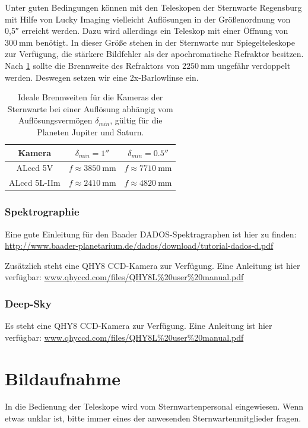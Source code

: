 \documentclass[10pt,a4paper,titlepage]{article}
\begin{document}
Unter guten Bedingungen können mit den Teleskopen der Sternwarte Regensburg mit Hilfe von Lucky Imaging vielleicht Auflösungen in der Größenordnung von \ang{;;0,5} erreicht werden. Dazu wird allerdings ein Teleskop mit einer Öffnung von $\SI{300}{\mm}$ benötigt. In dieser Größe stehen in der Sternwarte nur Spiegelteleskope zur Verfügung, die stärkere Bildfehler als der apochromatische Refraktor besitzen.
Nach \ref{tbl:kamerabrennweiten} sollte die Brennweite des Refraktors von $\SI{2250}{\mm}$ ungefähr verdoppelt werden. Deswegen setzen wir eine 2x-Barlowlinse ein.

\begin{table}
\begin{center}
\begin{tabular}{|c|c|c|}
\hline
Kamera & $\delta_{min} = \ang{;;1}$ & $\delta_{min} = \ang{;;0.5}$\\
\hline
ALccd 5V & $f \approx \SI{3850}{\mm}$ & $f \approx \SI{7710}{\mm}$\\
ALccd 5L-IIm & $f \approx \SI{2410}{\mm}$ & $f \approx \SI{4820}{\mm}$ \\
\hline
\end{tabular}
\caption{Ideale Brennweiten für die Kameras der Sternwarte bei einer Auflösung abhängig vom Auflösungsvermögen $\delta_{min}$, gültig für die Planeten Jupiter und Saturn.}
\label{tbl:kamerabrennweiten}
\end{center}
\end{table}

\subsubsection{Spektrographie}
Eine gute Einleitung für den Baader DADOS-Spektragraphen ist hier zu finden: \url{http://www.baader-planetarium.de/dados/download/tutorial-dados-d.pdf}

Zusätzlich steht eine QHY8 CCD-Kamera zur Verfügung. Eine Anleitung ist hier verfügbar: \url{www.qhyccd.com/files/QHY8L\%20user\%20manual.pdf}

\subsubsection{Deep-Sky}
Es steht eine QHY8 CCD-Kamera zur Verfügung. Eine Anleitung ist hier verfügbar: \url{www.qhyccd.com/files/QHY8L\%20user\%20manual.pdf}

\section{Bildaufnahme}
In die Bedienung der Teleskope wird vom Sternwartenpersonal eingewiesen. Wenn etwas unklar ist, bitte immer eines der anwesenden Sternwartenmitglieder fragen.
\end{document}
